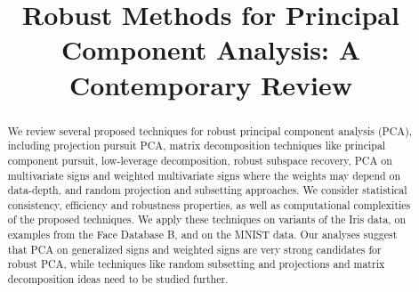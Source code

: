 \documentclass[ss]{imsart}
\theoremstyle{Example}
\begin{document}
\begin{frontmatter}

\title{Robust Methods for Principal Component Analysis: A Contemporary Review
}



\begin{abstract}
We review several proposed techniques for robust principal component analysis (PCA), including projection pursuit PCA, matrix decomposition techniques like principal component pursuit, low-leverage decomposition, robust subspace recovery, PCA on multivariate signs and weighted multivariate signs where the weights may depend on data-depth, and random projection and subsetting approaches. We consider statistical consistency, efficiency and robustness properties, as well as computational complexities of the proposed techniques. We apply these techniques on variants of the Iris data, on examples from the Face Database B, and on the MNIST data. Our analyses suggest that PCA on generalized signs and weighted signs are very strong candidates for robust PCA, while techniques like random subsetting and projections and matrix decomposition ideas need to be studied further. 
\end{abstract}

\begin{keyword}[class=MSC]
\end{keyword}

\begin{keyword}
\end{keyword}
\tableofcontents
\end{frontmatter}
\end{document}
